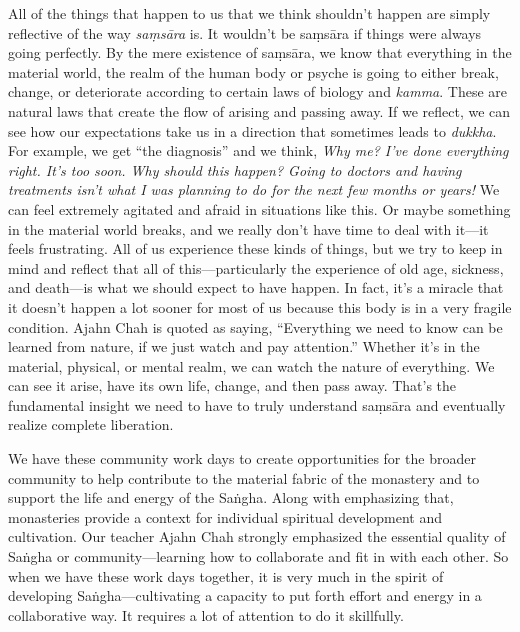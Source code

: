 All of the things that happen to us that we think shouldn't happen are 
simply reflective of the way \emph{saṃsāra} is. It wouldn't be 
saṃsāra if things were always going perfectly. By the mere existence 
of saṃsāra, we know that everything in the material world, the realm 
of the human body or psyche is going to either break, change, or 
deteriorate according to certain laws of biology and \emph{kamma}. 
These are natural laws that create the flow of arising and passing 
away. If we reflect, we can see how our expectations take us in a 
direction that sometimes leads to \emph{dukkha}. For example, we get 
``the diagnosis'' and we think, \emph{Why me? I've done everything 
right. It's too soon. Why should this happen? Going to doctors and 
having treatments isn't what I was planning to do for the next few 
months or years!} We can feel extremely agitated and afraid in 
situations like this. Or maybe something in the material world breaks, 
and we really don't have time to deal with it---it feels frustrating. 
All of us experience these kinds of things, but we try to keep in mind 
and reflect that all of this---particularly the experience of old age, 
sickness, and death---is what we should expect to have happen. In fact, 
it's a miracle that it doesn't happen a lot sooner for most of us 
because this body is in a very fragile condition. Ajahn Chah is quoted 
as saying, ``Everything we need to know can be learned from nature, if 
we just watch and pay attention.'' Whether it's in the material, 
physical, or mental realm, we can watch the nature of everything. We 
can see it arise, have its own life, change, and then pass away. That's 
the fundamental insight we need to have to truly understand saṃsāra 
and eventually realize complete liberation.


We have these community work days to create opportunities for the 
broader community to help contribute to the material fabric of the 
monastery and to support the life and energy of the Saṅgha. Along 
with emphasizing that, monasteries provide a context for individual 
spiritual development and cultivation. Our teacher Ajahn Chah strongly 
emphasized the essential quality of Saṅgha or community---learning 
how to collaborate and fit in with each other. So when we have these 
work days together, it is very much in the spirit of developing 
Saṅgha---cultivating a capacity to put forth effort and energy in a 
collaborative way. It requires a lot of attention to do it skillfully.

